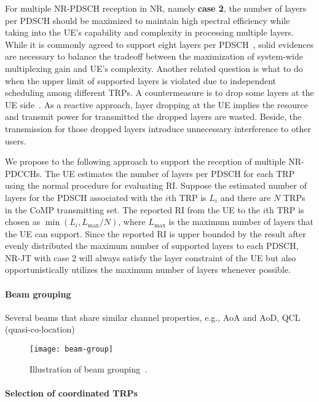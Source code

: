 \documentclass[a4paper,12pt]{article}%
\begin{document}
{For multiple NR-PDSCH reception in NR, namely \textbf{case 2}, the number of layers per PDSCH should be maximized to maintain high spectral efficiency while taking into the UE's capability and complexity in processing multiple layers. While it is commonly agreed to support eight layers per PDSCH~\cite{R1-1710141,R1-1710451}, solid evidences are necessary to balance the tradeoff between the maximization of system-wide multiplexing gain and UE's complexity. Another related question is what to do when the upper limit of supported layers is violated due to independent scheduling among different TRPs. A countermeasure is to drop some layers at the UE side~\cite{R1-1709924,R1-1710523}. As a reactive approach, layer dropping at the UE implies the resource and transmit power for transmitted the dropped layers are wasted. Beside, the transmission for those dropped layers introduce unnecessary interference to other users.

We propose to the following approach to support the reception of multiple NR-PDCCHs. The UE estimates the number of layers per PDSCH for each TRP using the normal procedure for evaluating RI. Suppose the estimated number of layers for the PDSCH associated with the $i$th TRP is $L_i$ and there are $N$ TRPs in the CoMP transmitting set. The reported RI from the UE to the $i$th TRP is chosen as $\min(L_i, L_{\max}/N)$, where $L_{\max}$ is the maximum number of layers that the UE can support. Since the reported RI is upper bounded by the result after evenly distributed the maximum number of supported layers to each PDSCH, NR-JT with case 2 will always satisfy the layer constraint of the UE but also opportunistically utilizes the maximum number of layers whenever possible.

\paragraph{Beam grouping}

Several beams that share similar channel properties, e.g., AoA  and AoD, QCL (quasi-co-location)

\begin{figure}[t]
        \centering
        \texttt{[image: beam-group]}
        \caption{Illustration of beam grouping~\cite{R1-1610891}.}\label{fig:beam-group}
\end{figure}

\paragraph{Selection of coordinated TRPs}

}
\end{document}
